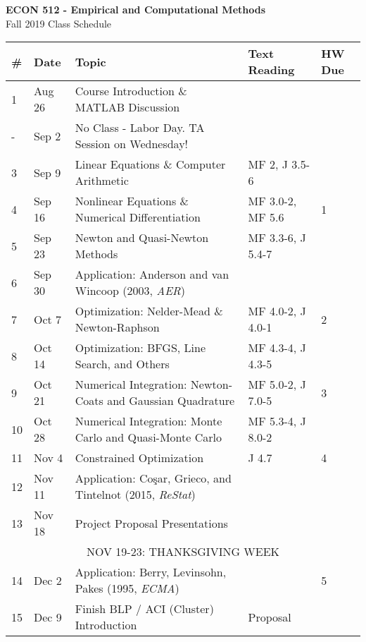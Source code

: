 \documentclass{article}
\begin{document}
\begin{center}
{\bf ECON 512 - Empirical and Computational Methods} \\
Fall 2019 Class Schedule 
\end{center}

\begin{center}
\begin{tabular}{l  l | l | l | l  }
\toprule
\# & Date & Topic & Text Reading & HW Due \\
\bottomrule
1 & Aug 26 & Course Introduction \& MATLAB Discussion &  & \\
-  & Sep 2 & No Class - Labor Day. TA Session on Wednesday! \\
3 & Sep 9 & Linear Equations \& Computer Arithmetic & MF 2, J 3.5-6 \\
4 & Sep 16  &  Nonlinear Equations \& Numerical Differentiation & MF 3.0-2, MF 5.6  & 1 \\ 
5 & Sep 23 & Newton and Quasi-Newton Methods & MF 3.3-6, J 5.4-7  & \\
6 & Sep 30 & Application: Anderson and van Wincoop (2003, \emph{AER})  &   \\
7 & Oct 7 & Optimization: Nelder-Mead \& Newton-Raphson & MF 4.0-2, J 4.0-1 & 2 \\
8 & Oct 14 & Optimization: BFGS, Line Search, and Others & MF 4.3-4, J 4.3-5 \\
9 & Oct 21 & Numerical Integration: Newton-Coats and Gaussian Quadrature & MF 5.0-2, J 7.0-5 & 3 \\
10 & Oct 28 & Numerical Integration: Monte Carlo and Quasi-Monte Carlo  & MF 5.3-4, J 8.0-2 &  \\
11 & Nov 4 & Constrained Optimization & J 4.7 &  4 \\
12 & Nov 11 & Application:  Co\c{s}ar, Grieco, and Tintelnot (2015, \emph{ReStat}) & &  \\
13 & Nov 18 & Project Proposal Presentations &  & \\ 
\multicolumn{5}{c}{NOV 19-23: THANKSGIVING WEEK } \\
14 & Dec 2 &  Application: Berry, Levinsohn, Pakes (1995, \emph{ECMA})  &   & 5  \\
15 & Dec 9  & Finish BLP / ACI (Cluster) Introduction & Proposal \\


\bottomrule
\end{tabular}
\end{center}
\end{document}
